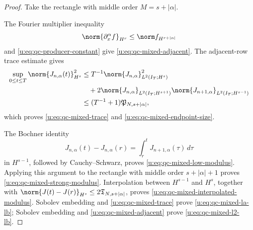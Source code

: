 \begin{proof}
Take the rectangle with middle order \(M=s+|\alpha|\).
\begin{samepage}
The Fourier
multiplier inequality
\[
 \norm{\partial_x^\alpha f}_{H^r}
 \le \norm f_{H^{r+|\alpha|}}
\]
and \eqref{u:eq:qc-producer-constant} give
\eqref{u:eq:qc-mixed-adjacent}.
The adjacent-row trace estimate gives
\begin{align*}
 \sup_{0\le t\le T}\norm{J_{n,\alpha}(t)}_{H^s}^2
 &\le T^{-1}\norm{J_{n,\alpha}}_{L^2(I_T;H^s)}^2\\
 &\quad+2\norm{J_{n,\alpha}}_{L^2(I_T;H^{s+1})}
          \norm{J_{n+1,\alpha}}_{L^2(I_T;H^{s-1})}\\
 &\le (T^{-1}+1)\mathfrak P_{N,s+|\alpha|},
\end{align*}
which proves \eqref{u:eq:qc-mixed-trace} and
\eqref{u:eq:qc-mixed-endpoint-size}.
\par
\end{samepage}
The Bochner identity
\[
 J_{n,\alpha}(t)-J_{n,\alpha}(r)
 =\int_r^tJ_{n+1,\alpha}(\tau)\,d\tau
\]
in \(H^{s-1}\), followed by Cauchy--Schwarz, proves
\eqref{u:eq:qc-mixed-low-modulus}.  Applying this argument to the rectangle
with middle order \(s+|\alpha|+1\) proves
\eqref{u:eq:qc-mixed-strong-modulus}.  Interpolation between
\(H^{s-1}\) and \(H^s\), together with
\(\norm{J(t)-J(r)}_{H^s}\le2\mathfrak T_{N,s+|\alpha|}\), proves
\eqref{u:eq:qc-mixed-interpolated-modulus}.  Sobolev embedding and
\eqref{u:eq:qc-mixed-trace} prove \eqref{u:eq:qc-mixed-la-lb}; Sobolev embedding
and \eqref{u:eq:qc-mixed-adjacent} prove \eqref{u:eq:qc-mixed-l2-lb}.
\end{proof}

